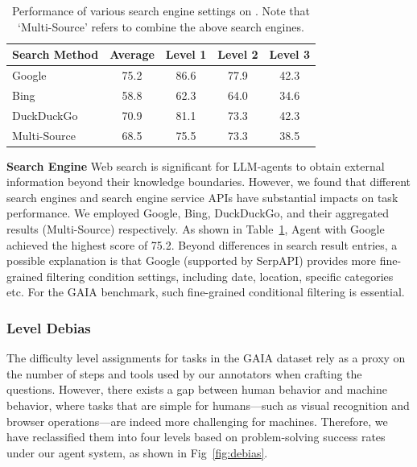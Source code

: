 \begin{table}[!h]
\centering
{}
\caption{Performance of various search engine settings on \gaia{}. Note that `Multi-Source' refers to combine the above search engines.}
\vspace{-9pt}
\label{tab:search}
\begin{tabular}{l|cccc}
\toprule
Search Method & Average & Level 1 & Level 2 & Level 3  \\
\midrule
Google        & 75.2 & 86.6 & 77.9 & 42.3 \\
Bing          & 58.8 & 62.3 & 64.0 & 34.6 \\
DuckDuckGo    & 70.9 & 81.1 & 73.3 & 42.3 \\
Multi-Source  & 68.5 & 75.5 & 73.3 & 38.5 \\
\bottomrule
\end{tabular}
\end{table}



\noindent \textbf{Search Engine}
Web search is significant for LLM-agents to obtain external information beyond their knowledge boundaries. However, we found that different search engines and search engine service APIs have substantial impacts on task performance. We employed Google, Bing, DuckDuckGo, and their aggregated results (Multi-Source) respectively. As shown in Table~\ref{tab:search}, Agent with Google achieved the highest score of 75.2. Beyond differences in search result entries, a possible explanation is that Google (supported by SerpAPI) provides more fine-grained filtering condition settings, including date, location,  specific categories etc. For the GAIA benchmark, such fine-grained conditional filtering is essential.


\subsubsection{Level Debias}
The difficulty level assignments for tasks in the GAIA dataset rely as a proxy on the number of steps and tools used by our annotators when crafting the questions. However, there exists a gap between human behavior and machine behavior, where tasks that are simple for humans—such as visual recognition and browser operations—are indeed more challenging for machines. Therefore, we have reclassified them into four levels based on problem-solving success rates under our agent system, as shown in Fig~\ref{fig:debias}.

